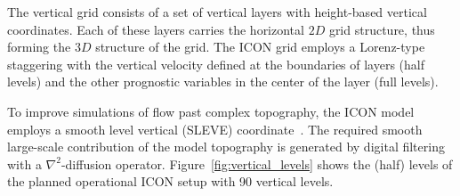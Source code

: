 The vertical grid consists of a set of vertical layers with height-based vertical coordinates.
Each of these layers carries the horizontal $2D$ grid structure, thus forming the $3D$ structure of the grid.
The ICON grid employs a Lorenz-type staggering with the vertical velocity defined at the boundaries of layers (half levels) 
and the other prognostic variables in the center of the layer (full levels).

To improve simulations of flow past complex topography, the ICON model employs a smooth level vertical (SLEVE) coordinate~\citet{Leuenberger2010}.
The required smooth large-scale contribution of the model topography is generated by digital filtering with a $\nabla^2$-diffusion operator.
Figure~\ref{fig:vertical_levels} shows the (half) levels of the planned operational ICON setup with 90 vertical levels.



